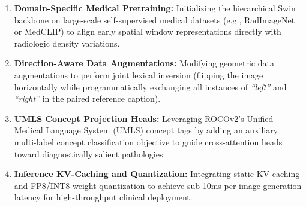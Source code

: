\begin{enumerate}
\item \textbf{Domain-Specific Medical Pretraining:} Initializing the hierarchical Swin backbone on large-scale self-supervised medical datasets (e.g., RadImageNet or MedCLIP) to align early spatial window representations directly with radiologic density variations.
\item \textbf{Direction-Aware Data Augmentations:} Modifying geometric data augmentations to perform joint lexical inversion (flipping the image horizontally while programmatically exchanging all instances of \emph{``left''} and \emph{``right''} in the paired reference caption).
\item \textbf{UMLS Concept Projection Heads:} Leveraging ROCOv2's Unified Medical Language System (UMLS) concept tags by adding an auxiliary multi-label concept classification objective to guide cross-attention heads toward diagnostically salient pathologies.
\item \textbf{Inference KV-Caching and Quantization:} Integrating static KV-caching and FP8/INT8 weight quantization to achieve sub-10ms per-image generation latency for high-throughput clinical deployment.
\end{enumerate}
